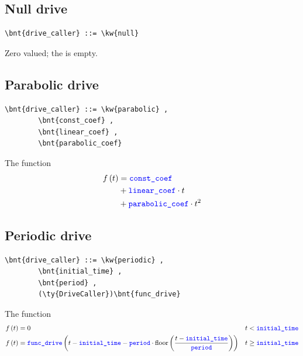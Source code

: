 \subsection{Null drive}
\begin{Verbatim}[commandchars=\\\{\}]
    \bnt{drive_caller} ::= \kw{null}
\end{Verbatim}
Zero valued; the  is empty.

\subsection{Parabolic drive}
\begin{Verbatim}[commandchars=\\\{\}]
    \bnt{drive_caller} ::= \kw{parabolic} ,
        \bnt{const_coef} , 
        \bnt{linear_coef} , 
        \bnt{parabolic_coef}
\end{Verbatim}
The function
\begin{align}
	f\left( t \right) &= \textcolor{blue}{\texttt{const\_coef}} \nonumber \\
		&+ \textcolor{blue}{\texttt{linear\_coef}} \cdot t \nonumber \\
		&+ \textcolor{blue}{\texttt{parabolic\_coef}} \cdot t^2
\end{align}

\subsection{Periodic drive}
\begin{Verbatim}[commandchars=\\\{\}]
    \bnt{drive_caller} ::= \kw{periodic} ,
        \bnt{initial_time} ,
        \bnt{period} ,
        (\ty{DriveCaller})\bnt{func_drive}
\end{Verbatim}
The function
\begin{align}
	f\left( t \right)
	&=
	0
	& t < \textcolor{blue}{\texttt{initial\_time}}
	\nonumber \\
	f\left( t \right)
	&=
	\textcolor{blue}{\texttt{func\_drive}}\left( 
		t
		-
		\textcolor{blue}{\texttt{initial\_time}}
		-
		\textcolor{blue}{\texttt{period}} \cdot \textrm{floor}\left( \frac{t - \textcolor{blue}{\texttt{initial\_time}}}{\textcolor{blue}{\texttt{period}}} \right)
	 \right)
	&
	t \ge \textcolor{blue}{\texttt{initial\_time}}
\end{align}

